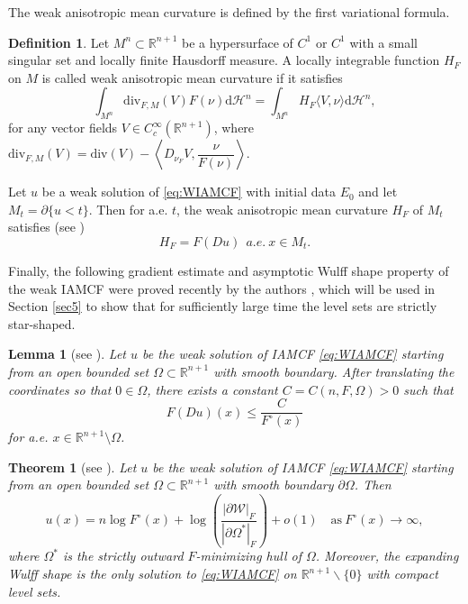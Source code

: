 \documentclass[11pt,reqno]{amsart}
\newtheorem{theorem}[proposition]{Theorem}
\newtheorem{lemma}[proposition]{Lemma}
\theoremstyle{definition}
\newtheorem{definition}[proposition]{Definition}
\theoremstyle{remark}
\numberwithin{equation}{section}
\begin{document}
	The weak anisotropic mean curvature is defined by the first variational formula.
	\begin{definition}
		\label{def-wamc}
		Let $M^n\subset\mathbb{R}^{n+1}$ be a hypersurface of $C^1$ or $C^1$ with a small singular set and locally finite Hausdorff measure. A locally integrable function $H_F$ on $M$ is called weak anisotropic mean curvature if it satisfies
		\begin{equation}
			\int_{M^n} \mathrm{div}_{F,M}(V) F(\nu)\mathrm{d}\mathcal{H}^{n} = \int_{M^n} H_F \langle V,\nu \rangle \mathrm{d}\mathcal{H}^{n},
			\label{equ-wamc}
		\end{equation}
		for any vector fields $V\in C_c^{\infty}(\mathbb{R}^{n+1})$, where $\mathrm{div}_{F,M}(V)=\mathrm{div}(V)-\left\langle D_{\nu_F} V, \dfrac{\nu}{F(\nu)} \right\rangle$.
	\end{definition}
	
Let $u$ be a weak solution of \eqref{eq:WIAMCF} with initial data $E_0$ and let $M_t=\partial\{u<t\}$. Then for a.e. $t$, the weak anisotropic mean curvature $H_F$ of $M_t$ satisfies (see {\cite[Proposition 3.5]{DGX23}})
\begin{equation} \label{lem-level}
H_F = F(Du)\ \ a.e.\ x\in M_t.
\end{equation}

Finally, the following gradient estimate and asymptotic Wulff shape property of the weak IAMCF were proved recently by the authors \cite{GWZ26}, which will be used in Section \ref{sec5} to show that for sufficiently large time the level sets are strictly star-shaped. 

\begin{lemma}[see {\cite[Corollary 1.5]{GWZ26}}]
	\label{lem:weak-gradient}
	Let $u$ be the weak solution of IAMCF \eqref{eq:WIAMCF} starting from an open bounded set $\Omega\subset\mathbb{R}^{n+1}$ with smooth boundary. After translating the coordinates so that $0\in\Omega$, there exists a constant $C=C(n,F,\Omega)>0$ such that
	\begin{equation}
		\label{eq:weak-gradient}
		F(Du)(x)\leq \frac{C}{F^\circ(x)}
	\end{equation}
	for a.e. $x\in\mathbb{R}^{n+1}\setminus\Omega$.
\end{lemma}

    \begin{theorem}[{see \cite[Theorem 1.6]{GWZ26}}]
    \label{thm:anisotropic-asymptotic}
        Let $u$ be the weak solution of IAMCF \eqref{eq:WIAMCF} starting from an open bounded set $\Omega\subset\mathbb{R}^{n+1}$ with smooth boundary $\partial\Omega$. Then
	   \begin{equation*}
		  u(x) = n\log F^{\circ}(x)+\log\left( \dfrac{|\partial\mathcal{W}|_F}{|\partial\Omega^*|_F} \right) + o(1) \quad \text{as} \ F^\circ(x) \to \infty,
	   \end{equation*}
        where $\Omega^*$ is the strictly outward $F$-minimizing hull of $\Omega$. Moreover, the expanding Wulff shape is the only solution to \eqref{eq:WIAMCF} on $\mathbb{R}^{n+1}\backslash\{0\}$ with compact level sets.
    \end{theorem}
	
\end{document}
